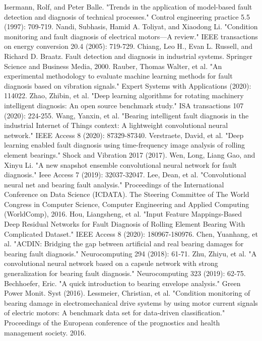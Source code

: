 \documentclass[conference]{IEEEtran}
\begin{document}
\begin{thebibliography}{00}
 Isermann, Rolf, and Peter Balle. "Trends in the application of model-based fault detection and diagnosis of technical processes." Control engineering practice 5.5 (1997): 709-719.
 Nandi, Subhasis, Hamid A. Toliyat, and Xiaodong Li. "Condition monitoring and fault diagnosis of electrical motors—A review." IEEE transactions on energy conversion 20.4 (2005): 719-729.
 Chiang, Leo H., Evan L. Russell, and Richard D. Braatz. Fault detection and diagnosis in industrial systems. Springer Science and Business Media, 2000.
 Rauber, Thomas Walter, et al. "An experimental methodology to evaluate machine learning methods for fault diagnosis based on vibration signals." Expert Systems with Applications (2020): 114022.
 Zhao, Zhibin, et al. "Deep learning algorithms for rotating machinery intelligent diagnosis: An open source benchmark study." ISA transactions 107 (2020): 224-255.
 Wang, Yanxin, et al. "Bearing intelligent fault diagnosis in the industrial Internet of Things context: A lightweight convolutional neural network." IEEE Access 8 (2020): 87329-87340.
 Verstraete, David, et al. "Deep learning enabled fault diagnosis using time-frequency image analysis of rolling element bearings." Shock and Vibration 2017 (2017).
 Wen, Long, Liang Gao, and Xinyu Li. "A new snapshot ensemble convolutional neural network for fault diagnosis." Ieee Access 7 (2019): 32037-32047.
 Lee, Dean, et al. "Convolutional neural net and bearing fault analysis." Proceedings of the International Conference on Data Science (ICDATA). The Steering Committee of The World Congress in Computer Science, Computer Engineering and Applied Computing (WorldComp), 2016.
 Hou, Liangsheng, et al. "Input Feature Mappings-Based Deep Residual Networks for Fault Diagnosis of Rolling Element Bearing With Complicated Dataset." IEEE Access 8 (2020): 180967-180976.
 Chen, Yuanhang, et al. "ACDIN: Bridging the gap between artificial and real bearing damages for bearing fault diagnosis." Neurocomputing 294 (2018): 61-71.
 Zhu, Zhiyu, et al. "A convolutional neural network based on a capsule network with strong generalization for bearing fault diagnosis." Neurocomputing 323 (2019): 62-75.
 Bechhoefer, Eric. "A quick introduction to bearing envelope analysis." Green Power Monit. Syst (2016).
 Lessmeier, Christian, et al. "Condition monitoring of bearing damage in electromechanical drive systems by using motor current signals of electric motors: A benchmark data set for data-driven classification." Proceedings of the European conference of the prognostics and health management society. 2016.
\end{thebibliography}
\vspace{12pt}
\end{document}
